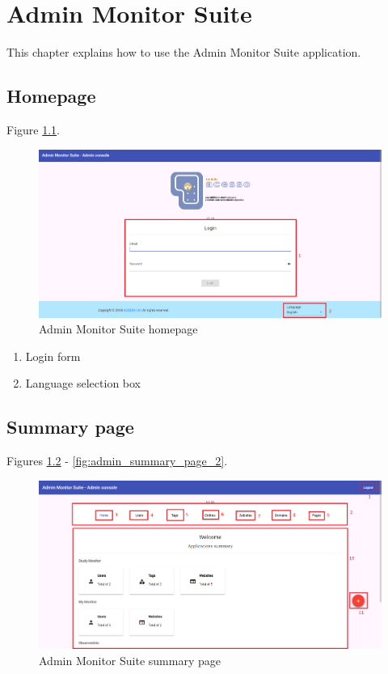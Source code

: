 \chapter{Admin Monitor Suite}

This chapter explains how to use the Admin Monitor Suite application.

\section{Homepage}

Figure \ref{fig:admin_homepage}.

\begin{figure}[H]
    \centering
    \includegraphics[width=\linewidth]{lib/images/admin/admin_homepage.png}
    \caption{Admin Monitor Suite homepage}
    \label{fig:admin_homepage}
\end{figure}

\begin{enumerate}
    \item Login form
    \item Language selection box
\end{enumerate}

\section{Summary page}

Figures \ref{fig:admin_summary_page} - \ref{fig:admin_summary_page_2}.

\begin{figure}[H]
    \centering
    \includegraphics[width=\linewidth]{lib/images/admin/admin_summary_page.png}
    \caption{Admin Monitor Suite summary page}
    \label{fig:admin_summary_page}
\end{figure}

